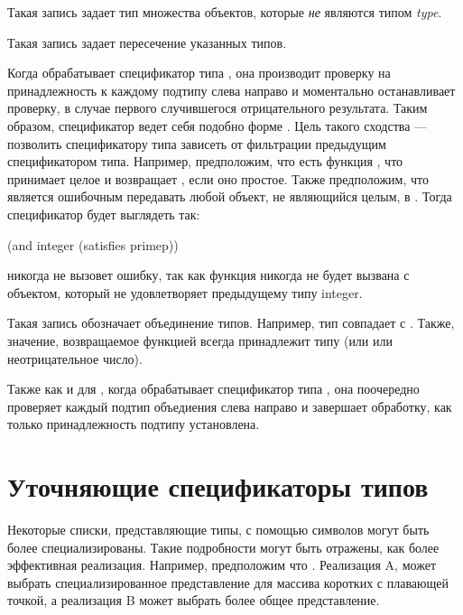 \begin{flushdesc}
\item[\cd{(not \emph{type})}]

Такая запись задает тип множества объектов, которые \emph{не} являются типом {\it
  type}.
\item[\cd{(and \emph{type1} \emph{type2} ...)}]

Такая запись задает пересечение указанных типов.

Когда  обрабатывает спецификатор типа , она производит
проверку на принадлежность к каждому подтипу слева направо и моментально
останавливает проверку, в случае первого случившегося отрицательного
результата. Таким образом, спецификатор  ведет себя подобно форме
. Цель такого сходства --- позволить спецификатору типа 
зависеть от фильтрации предыдущим спецификатором типа. Например, предположим,
что есть функция , что принимает целое и возвращает {\true}, если оно
простое. Также предположим, что является ошибочным передавать любой объект, не
являющийся целым, в . Тогда спецификатор будет выглядеть так:
\begin{lisp}
(and integer (satisfies primep))
\end{lisp}
никогда не вызовет ошибку, так как функция  никогда не будет вызвана
с объектом, который не удовлетворяет предыдущему типу integer.

\item[\cd{(or \emph{type1} \emph{type2} ...)}]

Такая запись обозначает объединение типов. Например, тип  совпадает с
. Также, значение, возвращаемое функцией  всегда
принадлежит типу  (или {\nil} или неотрицательное число).

Также как и для , когда  обрабатывает спецификатор типа
, она поочередно проверяет каждый подтип объедиения слева направо и
завершает обработку, как только принадлежность подтипу установлена.
\end{flushdesc}

\section{Уточняющие спецификаторы типов}
\label{SPECIALIZED-TYPE-SPECIFIER-SECTION}

Некоторые списки, представляющие типы, с помощью символов могут быть более
специализированы. Такие подробности могут быть отражены, как более эффективная
реализация. Например, предположим что . Реализация A,
может выбрать специализированное представление для массива коротких с плавающей
точкой, а реализация B может выбрать более общее представление.

